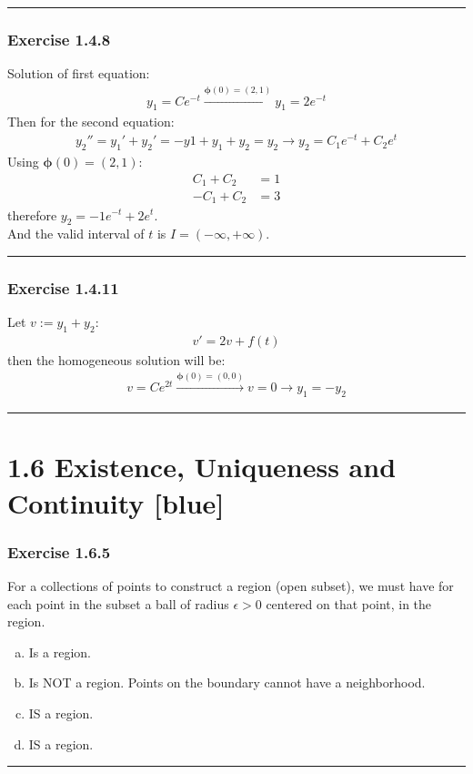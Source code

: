 \documentclass[12pt, letterpaper]{scrartcl}
\begin{document}
\vskip1mm\hrule
\subsubsection*{Exercise 1.4.8}
Solution of first equation:
\begin{align*}
    y_1=Ce^{-t}\xrightarrow{\bm{\phi}(0)=(2,1)}y_1=2e^{-t}
\end{align*}
Then for the second equation:
\begin{align*}
    y_2''=y_1'+y_2'=-y1+y_1+y_2=y_2\rightarrow y_2=C_1e^{-t}+C_2e^{t}
\end{align*}
Using $\bm{\phi}(0)=(2,1)$:
\begin{align*}
    C_1+C_2&=1\\
    -C_1+C_2&=3
\end{align*}
therefore $y_2=-1e^{-t}+2e^{t}$.\\
And the valid interval of $t$ is $I=(-\infty,+\infty)$.
\vskip1mm\hrule

\subsubsection*{Exercise 1.4.11}
Let $v:=y_1+y_2$:
\begin{align*}
    v'=2v+f(t)
\end{align*}
then the homogeneous solution will be:
\begin{align*}
    v=Ce^{2t}\xrightarrow{\bm{\phi}(0)=(0,0)}v=0 \rightarrow y_1=-y_2
\end{align*}
\vskip1mm\hrule
\clearpage

\section*{1.6 Existence, Uniqueness and Continuity \xrfill[2pt]{3pt}[blue]}

\subsubsection*{Exercise 1.6.5}
For a collections of points to construct a region (open subset), we must have for each point in the subset a ball of radius $\epsilon>0$ centered on that point, in the region.
\begin{enumerate}[(a)]
    \item Is a region.
    \item Is NOT a region. Points on the boundary cannot have a neighborhood.
    \item IS a region.
    \item IS a region.
\end{enumerate}
\vskip1mm\hrule
\end{document}
